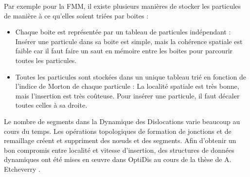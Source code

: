 \documentclass[11pt,class=article,float=false,crop=false]{standalone}
\begin{document}
Par exemple pour la FMM, il existe plusieurs manières de stocker les particules de manière à ce qu'elles soient triées par boites : 
\begin{itemize}
	\item Chaque boite est représentée par un tableau de particules indépendant : Insérer une particule dans sa boite est simple, mais la cohérence spatiale est faible car il faut faire un saut en mémoire entre les boites pour parcourir toutes les particules.
	\item Toutes les particules sont stockées dans un unique tableau trié en fonction de l'indice de Morton de chaque particule : La localité spatiale est très bonne, mais l'insertion est très coûteuse. Pour insérer une particule, il faut décaler toutes celles à sa droite.
\end{itemize}

Le nombre de segments dans la Dynamique des Dislocations varie beaucoup au cours du temps. Les opérations topologiques de formation de jonctions et de remaillage créent et suppriment des nœuds et des segments. Afin d'obtenir un bon compromis entre localité et vitesse d'insertion, des structures de données dynamiques ont été mises en œuvre dans OptiDis au cours de la thèse de A. Etcheverry .
\end{document}
